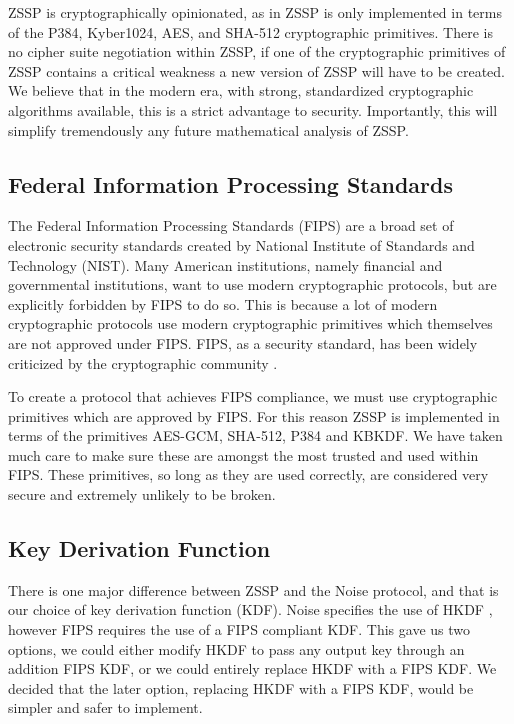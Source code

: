 \documentclass{article}
\begin{document}
ZSSP is cryptographically opinionated, as in ZSSP is only implemented in terms of the P384, Kyber1024, AES, and SHA-512 cryptographic primitives. There is no cipher suite negotiation within ZSSP, if one of the cryptographic primitives of ZSSP contains a critical weakness a new version of ZSSP will have to be created. We believe that in the modern era, with strong, standardized cryptographic algorithms available, this is a strict advantage to security. Importantly, this will simplify tremendously any future mathematical analysis of ZSSP.

\subsection{Federal Information Processing Standards}

The Federal Information Processing Standards (FIPS) are a broad set of electronic security standards created by National Institute of Standards and Technology (NIST). Many American institutions, namely financial and governmental institutions, want to use modern cryptographic protocols, but are explicitly forbidden by FIPS to do so. This is because a lot of modern cryptographic protocols use modern cryptographic primitives which themselves are not approved under FIPS. FIPS, as a security standard, has been widely criticized by the cryptographic community \cite{219400} \cite{fips_blog}.

To create a protocol that achieves FIPS compliance, we must use cryptographic primitives which are approved by FIPS. For this reason ZSSP is implemented in terms of the primitives AES-GCM, SHA-512, P384 and KBKDF. We have taken much care to make sure these are amongst the most trusted and used within FIPS. These primitives, so long as they are used correctly, are considered very secure and extremely unlikely to be broken.

\subsection{Key Derivation Function}

There is one major difference between ZSSP and the Noise protocol, and that is our choice of key derivation function (KDF). Noise specifies the use of HKDF \cite{hkdf}, however FIPS requires the use of a FIPS compliant KDF. This gave us two options, we could either modify HKDF to pass any output key through an addition FIPS KDF, or we could entirely replace HKDF with a FIPS KDF. We decided that the later option, replacing HKDF with a FIPS KDF, would be simpler and safer to implement.
\end{document}
